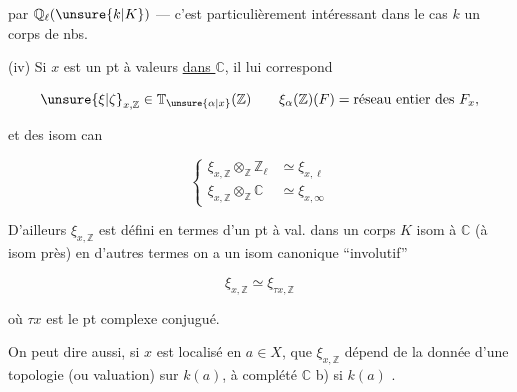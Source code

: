 par $\mathbb{Q}_{\ell}(\unsure{k|K})$ --- c’est particulièrement intéressant dans le cas $k$ un corps de nbs.

(iv) Si $x$ est un pt à valeurs \uline{dans $\mathbb{C}$}, il lui correspond

\[
\unsure{\xi|\zeta}_{x,\mathbb{Z}}\in\mathbb{T}_{\unsure{\alpha|x}}(\mathbb{Z})\qquad
\xi_{\alpha}(\mathbb{Z})(F)=\text{réseau entier des }F_x,
\]


et des isom can

\[
\left\{\begin{aligned}
\xi_{x,\mathbb{Z}}\otimes_{\mathbb{Z}}\mathbb{Z}_{\ell}&\simeq\xi_{x,\ell}\\
\xi_{x,\mathbb{Z}}\otimes_{\mathbb{Z}}\mathbb{C}&\simeq\xi_{x,\infty}
\end{aligned}\right.
\]

D’ailleurs $\xi_{x,\mathbb{Z}}$ est défini en termes d’un pt à val. dans un corps  $K$ isom à $\mathbb{C}$ (à isom  près) en d’autres termes on a un isom canonique ``involutif''

\[
\xi_{x,\mathbb{Z}}\simeq\xi_{\tau x,\mathbb{Z}}
\]

où $\tau x$ est le pt complexe conjugué.

 On peut dire aussi, si $x$ est localisé en $a\in X$, que  $\xi_{x,\mathbb{Z}}$ dépend de la donnée d’une topologie  (ou valuation) sur $k(a)$, à complété $\mathbb{C}$ \enspace b) si $k(a)$ .

